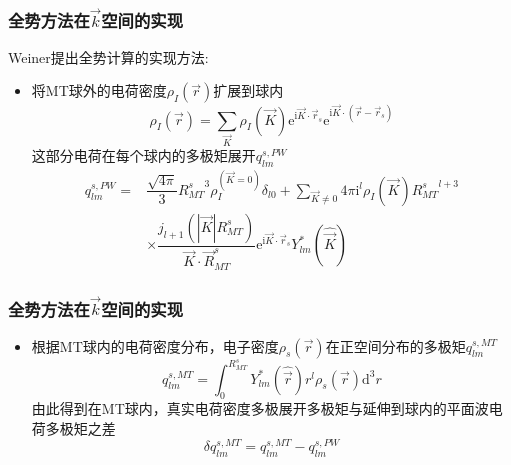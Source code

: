 {\frame
{
	\frametitle{全势方法在$\vec k$空间的实现}
\textrm{Weiner}提出全势计算的实现方法:~\\
\begin{itemize}
	\item 将\textrm{MT}球外的电荷密度$\rho_I(\vec r)$扩展到球内
	\begin{displaymath}
		\rho_I(\vec r)=\sum_{\vec K}\rho_I(\vec K)\mathrm{e}^{\mathrm{i}\vec K\cdot\vec r_s}\mathrm{e}^{\mathrm{i}\vec K\cdot(\vec r-\vec r_s)}
	\end{displaymath}
	这部分电荷在每个球内的多极矩展开$q_{lm}^{s,PW}$
	\begin{displaymath}
		\begin{aligned}
			q_{lm}^{s,PW}=&\dfrac{\sqrt{4\pi}}3{R_{MT}^s}^3\rho_I^{(\vec K=0)}\delta_{l0}+\sum_{\vec K\neq0}4\pi\mathrm{i}^l\rho_I(\vec K){R_{MT}^s}^{l+3}\\
			&\times\dfrac{j_{l+1}(|\vec K|R_{MT}^s)}{\vec K\cdot\vec R_{MT}^s}\mathrm{e}^{\mathrm{i}\vec K\cdot\vec r_s}Y_{lm}^{\ast}(\hat{\vec K})
		\end{aligned}
	\end{displaymath}
\end{itemize}
}

\frame
{
	\frametitle{全势方法在$\vec k$空间的实现}
\begin{itemize}
	\item 根据\textrm{MT}球内的电荷密度分布，电子密度$\rho_s(\vec r)$在正空间分布的多极矩$q_{lm}^{s,MT}$
\begin{displaymath}
	q_{lm}^{s,MT}=\int_0^{R_{MT}^s}Y_{lm}^{\ast}(\hat{\vec r})r^l\rho_s(\vec r)\mathrm{d}^3r
\end{displaymath}
由此得到在\textrm{MT}球内，真实电荷密度多极展开多极矩与延伸到球内的平面波电荷多极矩之差
	\begin{displaymath}
		\delta q_{lm}^{s,MT}=q_{lm}^{s,MT}-q_{lm}^{s,PW}
	\end{displaymath}
\end{itemize}
}

}
